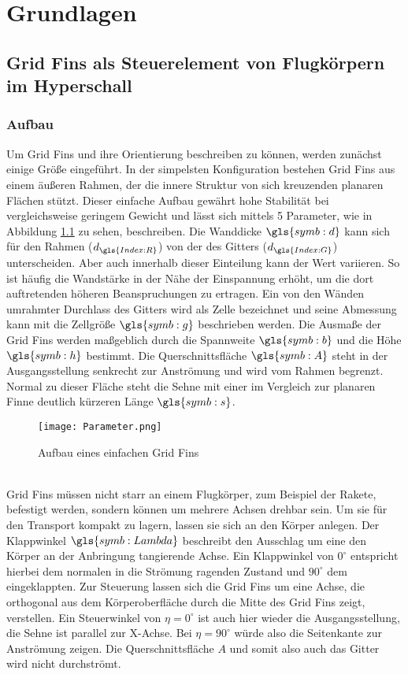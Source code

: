 \chapter{Grundlagen}
\label{sec:grundlagen}

\section{Grid Fins als Steuerelement von Flugkörpern im Hyperschall}
\subsection{Aufbau}
Um Grid Fins und ihre Orientierung beschreiben zu können, werden zunächst einige Größe eingeführt.
In der simpelsten Konfiguration bestehen Grid Fins aus einem äußeren Rahmen, der die innere Struktur von sich kreuzenden planaren Flächen stützt. Dieser einfache Aufbau gewährt hohe Stabilität bei vergleichsweise geringem Gewicht \cite{zellform} und lässt sich mittels 5 Parameter, wie in Abbildung \ref{abb_parameter} zu sehen, beschreiben. Die Wanddicke $\gls{symb:d}$ kann sich für den Rahmen ($d_{\gls{Index:R}}$) von der des Gitters ($d_{\gls{Index:G}}$) unterscheiden. Aber auch innerhalb dieser Einteilung kann der Wert variieren. So ist häufig die Wandstärke in der Nähe der Einspannung erhöht, um die dort auftretenden höheren Beanspruchungen zu ertragen. Ein von den Wänden umrahmter Durchlass des Gitters wird als Zelle bezeichnet und seine Abmessung kann mit die Zellgröße $\gls{symb:g}$ beschrieben werden. Die Ausmaße der Grid Fins werden maßgeblich durch die Spannweite $\gls{symb:b}$ und die Höhe $\gls{symb:h}$ bestimmt. Die Querschnittsfläche $\gls{symb:A}$ steht in der Ausgangsstellung senkrecht zur Anströmung und wird vom Rahmen begrenzt. Normal zu dieser Fläche steht die Sehne mit einer im Vergleich zur planaren Finne deutlich kürzeren Länge $\gls{symb:s}$.\\
\begin{figure}[h]
	\centering
	\texttt{[image: Parameter.png]}
	\caption{Aufbau eines einfachen Grid Fins}
	\label{abb_parameter}
\end{figure}\\
Grid Fins müssen nicht starr an einem Flugkörper, zum Beispiel der Rakete, befestigt werden, sondern können um mehrere Achsen drehbar sein. Um sie für den Transport kompakt zu lagern, lassen sie sich an den Körper anlegen. Der Klappwinkel $\gls{symb:Lambda}$ beschreibt den Ausschlag um eine den Körper an der Anbringung tangierende Achse. Ein Klappwinkel von $0^\circ$ entspricht hierbei dem normalen in die Strömung ragenden Zustand und $90^\circ$ dem eingeklappten. Zur Steuerung lassen sich die Grid Fins um eine Achse, die orthogonal aus dem Körperoberfläche durch die Mitte des Grid Fins zeigt, verstellen. Ein Steuerwinkel von $\eta = 0^\circ$ ist auch hier wieder die Ausgangsstellung, die Sehne ist parallel zur X-Achse. Bei $\eta = 90^\circ$ würde also die Seitenkante zur Anströmung zeigen. Die Querschnittsfläche $A$ und somit also auch das Gitter wird nicht durchströmt.
